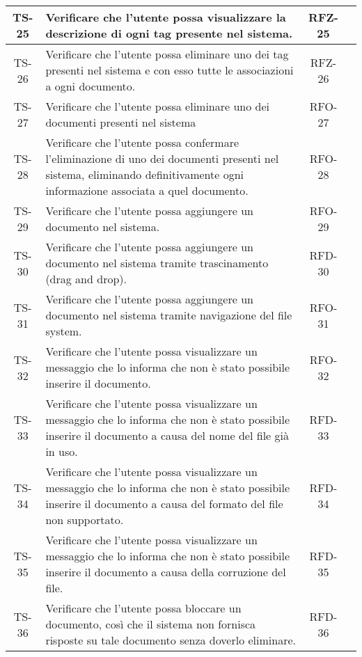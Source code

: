 \begin{xltabular}{\textwidth}{| c | X | c | c |}
    \hline
    TS-25 & Verificare che l’utente possa visualizzare la descrizione di ogni tag presente nel sistema. & RFZ-25 & \textcolor{xmarkcolor}{} \\
    \hline
    TS-26 & Verificare che l’utente possa eliminare uno dei tag presenti nel sistema e con esso tutte le associazioni a ogni documento. & RFZ-26 & \textcolor{xmarkcolor}{} \\
    \hline
    TS-27 & Verificare che l’utente possa eliminare uno dei documenti presenti nel sistema & RFO-27 & \textcolor{xmarkcolor}{} \\
    \hline
    TS-28 & Verificare che l’utente possa confermare l’eliminazione di uno dei documenti presenti nel sistema, eliminando definitivamente  ogni informazione associata a quel documento. & RFO-28 & \textcolor{xmarkcolor}{} \\
    \hline
    TS-29 & Verificare che l’utente possa aggiungere un documento nel sistema. & RFO-29 & \textcolor{xmarkcolor}{} \\
    \hline
    TS-30 & Verificare che l’utente possa aggiungere un documento nel sistema tramite trascinamento (drag and drop). & RFD-30 & \textcolor{xmarkcolor}{} \\
    \hline
    TS-31 & Verificare che l’utente possa aggiungere un documento nel sistema tramite navigazione del file system. & RFO-31 & \textcolor{xmarkcolor}{} \\
    \hline
    TS-32 & Verificare che l'utente possa visualizzare un messaggio che lo informa che non è stato possibile inserire il documento. & RFO-32 & \textcolor{xmarkcolor}{} \\
    \hline
    TS-33 & Verificare che l'utente possa visualizzare un messaggio che lo informa che non è stato possibile inserire il documento a causa del nome del file già in uso. & RFD-33 & \textcolor{xmarkcolor}{} \\
    \hline
    TS-34 & Verificare che l’utente possa visualizzare un messaggio che lo informa che non è stato possibile inserire il documento a causa del formato del file non supportato. & RFD-34 & \textcolor{xmarkcolor}{} \\
    \hline
    TS-35 & Verificare che l’utente possa visualizzare un messaggio che lo informa che non è stato possibile inserire il documento a causa della corruzione del file. & RFD-35 & \textcolor{xmarkcolor}{} \\
    \hline
    TS-36 & Verificare che l'utente possa bloccare un documento, così che il sistema non fornisca risposte su tale documento senza doverlo eliminare. & RFD-36 & \textcolor{xmarkcolor}{} \\

\end{xltabular}
